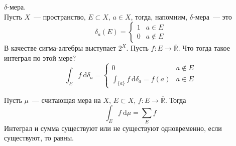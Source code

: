 \documentclass{article}
\begin{document}
    \begin{example}
        $\delta$-мера.\\
        Пусть $X$~--- пространство, $E\subset X$, $a\in X$, тогда, напомним, $\delta$-мера~--- это
        $$\delta_a(E)=\begin{cases}
            1 & a\in E\\
            0 & a\notin E
        \end{cases}$$
        В качестве сигма-алгебры выступает $2^X$. Пусть $f\colon E\to\overline{\mathbb R}$. Что тогда такое интеграл по этой мере?
        $$
        \int_Ef~\mathrm d\delta_a=\begin{cases}
            0 & a\notin E\\
            \int_{\{a\}}f~\mathrm d\delta_a=f(a) & a\in E
        \end{cases}
        $$
    \end{example}
    \begin{lemma}
        Пусть $\mu$~--- считающая мера на $X$, $E\subset X$, $f\colon E\to\overline{\mathbb R}$. Тогда
        $$
        \int_Ef~\mathrm d\mu=\sum\limits_Ef
        $$
        Интеграл и сумма существуют или не существуют одновременно, если существуют, то равны.
    \end{lemma}
\end{document}
